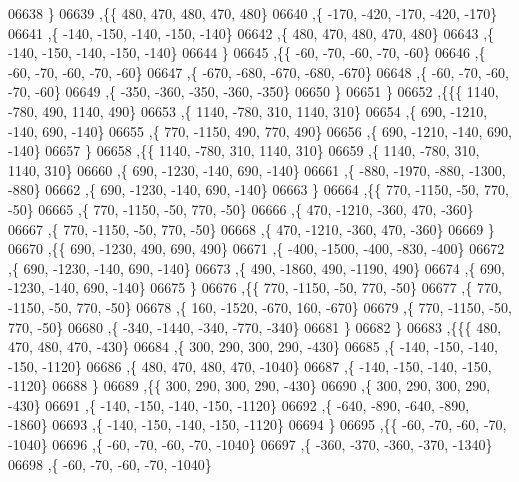 \begin{DoxyCode}
06638     \}
06639    ,\{\{   480,   470,   480,   470,   480\}
06640     ,\{  -170,  -420,  -170,  -420,  -170\}
06641     ,\{  -140,  -150,  -140,  -150,  -140\}
06642     ,\{   480,   470,   480,   470,   480\}
06643     ,\{  -140,  -150,  -140,  -150,  -140\}
06644     \}
06645    ,\{\{   -60,   -70,   -60,   -70,   -60\}
06646     ,\{   -60,   -70,   -60,   -70,   -60\}
06647     ,\{  -670,  -680,  -670,  -680,  -670\}
06648     ,\{   -60,   -70,   -60,   -70,   -60\}
06649     ,\{  -350,  -360,  -350,  -360,  -350\}
06650     \}
06651    \}
06652   ,\{\{\{  1140,  -780,   490,  1140,   490\}
06653     ,\{  1140,  -780,   310,  1140,   310\}
06654     ,\{   690, -1210,  -140,   690,  -140\}
06655     ,\{   770, -1150,   490,   770,   490\}
06656     ,\{   690, -1210,  -140,   690,  -140\}
06657     \}
06658    ,\{\{  1140,  -780,   310,  1140,   310\}
06659     ,\{  1140,  -780,   310,  1140,   310\}
06660     ,\{   690, -1230,  -140,   690,  -140\}
06661     ,\{  -880, -1970,  -880, -1300,  -880\}
06662     ,\{   690, -1230,  -140,   690,  -140\}
06663     \}
06664    ,\{\{   770, -1150,   -50,   770,   -50\}
06665     ,\{   770, -1150,   -50,   770,   -50\}
06666     ,\{   470, -1210,  -360,   470,  -360\}
06667     ,\{   770, -1150,   -50,   770,   -50\}
06668     ,\{   470, -1210,  -360,   470,  -360\}
06669     \}
06670    ,\{\{   690, -1230,   490,   690,   490\}
06671     ,\{  -400, -1500,  -400,  -830,  -400\}
06672     ,\{   690, -1230,  -140,   690,  -140\}
06673     ,\{   490, -1860,   490, -1190,   490\}
06674     ,\{   690, -1230,  -140,   690,  -140\}
06675     \}
06676    ,\{\{   770, -1150,   -50,   770,   -50\}
06677     ,\{   770, -1150,   -50,   770,   -50\}
06678     ,\{   160, -1520,  -670,   160,  -670\}
06679     ,\{   770, -1150,   -50,   770,   -50\}
06680     ,\{  -340, -1440,  -340,  -770,  -340\}
06681     \}
06682    \}
06683   ,\{\{\{   480,   470,   480,   470,  -430\}
06684     ,\{   300,   290,   300,   290,  -430\}
06685     ,\{  -140,  -150,  -140,  -150, -1120\}
06686     ,\{   480,   470,   480,   470, -1040\}
06687     ,\{  -140,  -150,  -140,  -150, -1120\}
06688     \}
06689    ,\{\{   300,   290,   300,   290,  -430\}
06690     ,\{   300,   290,   300,   290,  -430\}
06691     ,\{  -140,  -150,  -140,  -150, -1120\}
06692     ,\{  -640,  -890,  -640,  -890, -1860\}
06693     ,\{  -140,  -150,  -140,  -150, -1120\}
06694     \}
06695    ,\{\{   -60,   -70,   -60,   -70, -1040\}
06696     ,\{   -60,   -70,   -60,   -70, -1040\}
06697     ,\{  -360,  -370,  -360,  -370, -1340\}
06698     ,\{   -60,   -70,   -60,   -70, -1040\}

\end{DoxyCode}
